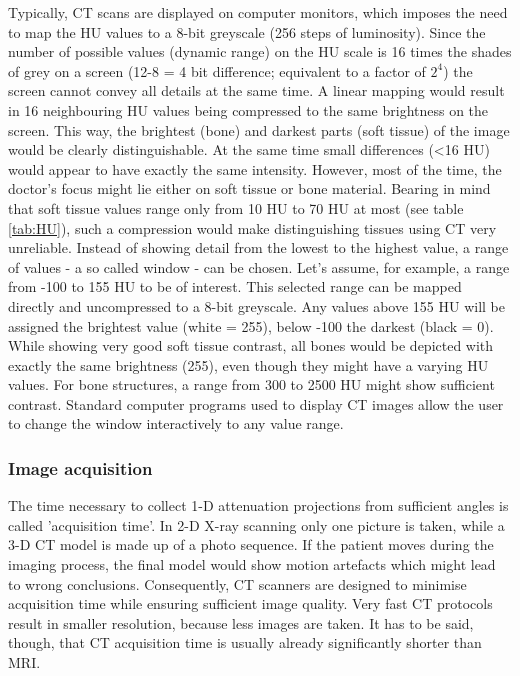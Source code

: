 Typically, CT scans are displayed on computer monitors, which imposes the need to map the HU values to a 8-bit greyscale (256 steps of luminosity).
Since the number of possible values (dynamic range) on the HU scale is 16 times the shades of grey on a screen (12-8 = 4 bit difference; equivalent to a factor of $2^4$) the screen cannot convey all details at the same time.
A linear mapping would result in 16 neighbouring HU values being compressed to the same brightness on the screen.
This way, the brightest (bone) and darkest parts (soft tissue) of the image would be clearly distinguishable.
At the same time small differences (<16 HU) would appear to have exactly the same intensity.
However, most of the time, the doctor's focus might lie either on soft tissue or bone material.
Bearing in mind that soft tissue values range only from 10 HU to 70 HU at most (see table \ref{tab:HU}), such a compression would make distinguishing tissues using CT very unreliable.
Instead of showing detail from the lowest to the highest value, a range of values - a so called window - can be chosen.
Let's assume, for example, a range from -100 to 155 HU to be of interest.
This selected range can be mapped directly and uncompressed to a 8-bit greyscale.
Any values above 155 HU will be assigned the brightest value (white = 255), below -100 the darkest (black = 0).
While showing very good soft tissue contrast, all bones would be depicted with exactly the same brightness (255), even though they might have a varying HU values.
For bone structures, a range from 300 to 2500 HU might show sufficient contrast.
Standard computer programs used to display CT images allow the user to change the window interactively to any value range. \cite{Podgorsak, Maidment2014}

\subsubsection{Image acquisition}
The time necessary to collect 1-D attenuation projections from sufficient angles is called 'acquisition time'.
In 2-D X-ray scanning only one picture is taken, while a 3-D CT model is made up of a photo sequence.
If the patient moves during the imaging process, the final model would show motion artefacts which might lead to wrong conclusions.
Consequently, CT scanners are designed to minimise acquisition time while ensuring sufficient image quality.
Very fast CT protocols result in smaller resolution, because less images are taken.
It has to be said, though, that CT acquisition time is usually already significantly shorter than MRI. \cite{Podgorsak, Maidment2014}

